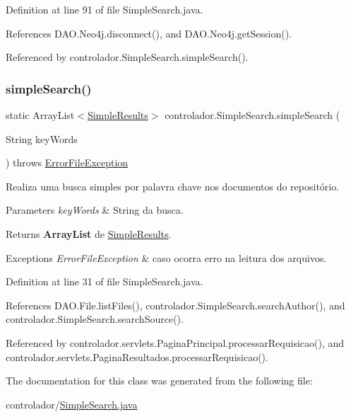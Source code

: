 Definition at line 91 of file Simple\+Search.\+java.



References D\+A\+O.\+Neo4j.\+disconnect(), and D\+A\+O.\+Neo4j.\+get\+Session().



Referenced by controlador.\+Simple\+Search.\+simple\+Search().

\hypertarget{classcontrolador_1_1SimpleSearch_acfd709c809ee48bf72041a0872f3a8e9}{}\label{classcontrolador_1_1SimpleSearch_acfd709c809ee48bf72041a0872f3a8e9} 
\subsubsection{\texorpdfstring{simple\+Search()}{simpleSearch()}}
{\footnotesize\ttfamily static Array\+List$<$\hyperlink{classentidade_1_1resultados_1_1SimpleResults}{Simple\+Results}$>$ controlador.\+Simple\+Search.\+simple\+Search (\begin{DoxyParamCaption}\item[{String}]{key\+Words }\end{DoxyParamCaption}) throws \hyperlink{classexcessao_1_1ErrorFileException}{Error\+File\+Exception}\hspace{0.3cm}{\ttfamily [static]}}

Realiza uma busca simples por palavra chave nos documentos do repositório. 
\begin{DoxyParams}{Parameters}
{\em key\+Words} & String da busca. \\
\hline
\end{DoxyParams}
\begin{DoxyReturn}{Returns}
{\bfseries Array\+List} de \hyperlink{}{Simple\+Results}. 
\end{DoxyReturn}

\begin{DoxyExceptions}{Exceptions}
{\em Error\+File\+Exception} & caso ocorra erro na leitura dos arquivos. \\
\hline
\end{DoxyExceptions}


Definition at line 31 of file Simple\+Search.\+java.



References D\+A\+O.\+File.\+list\+Files(), controlador.\+Simple\+Search.\+search\+Author(), and controlador.\+Simple\+Search.\+search\+Source().



Referenced by controlador.\+servlets.\+Pagina\+Principal.\+processar\+Requisicao(), and controlador.\+servlets.\+Pagina\+Resultados.\+processar\+Requisicao().



The documentation for this class was generated from the following file\+:\begin{DoxyCompactItemize}
\item 
controlador/\hyperlink{SimpleSearch_8java}{Simple\+Search.\+java}\end{DoxyCompactItemize}
